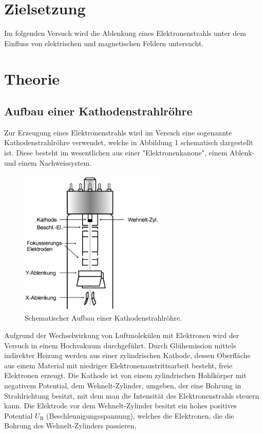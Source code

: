 \section{Zielsetzung}
\label{sec:Zielsetzung}
Im folgenden Versuch wird die Ablenkung eines Elektronenstrahls unter dem Einfluss von
elektrischen und magnetischen Feldern untersucht.

\section{Theorie}
\label{sec:Theorie}
\subsection{Aufbau einer Kathodenstrahlröhre}
Zur Erzeugung eines Elektronenstrahls wird im Versuch eine sogenannte Kathodenstrahlröhre verwendet,
welche in Abbildung 1 schematisch dargestellt ist. Diese besteht im wesentlichen aus einer 
"Elektronenkanone", einem Ablenk- und einem Nachweissystem.
\begin{figure}[H]
  \centering
  \includegraphics[height=7cm]{schema1.png}
  \caption{Schematischer Aufbau einer Kathodenstrahlröhre. \cite[S.2]{kent}}
\end{figure}
Aufgrund der Wechselwirkung von Luftmolekülen mit Elektronen wird der Versuch in einem Hochvakuum durchgeführt.
Durch Glühemission mittels indirekter Heizung werden aus einer zylindrischen Kathode, dessen Oberfläche aus einem Material
mit niedriger Elektronenaustrittsarbeit besteht, freie Elektronen erzeugt. Die Kathode ist
von einem zylindrischen Hohlkörper mit negativem Potential, dem Wehnelt-Zylinder, umgeben, 
der eine Bohrung in Strahlrichtung besitzt, mit dem man die Intensität des Elektronenstrahls
steuern kann. Die Elektrode vor dem Wehnelt-Zylinder besitzt ein hohes positives Potential $U_\text{B}$ 
(Beschleunigungsspannung), welches die Elektronen, die die Bohrung des Wehnelt-Zylinders passieren, 
